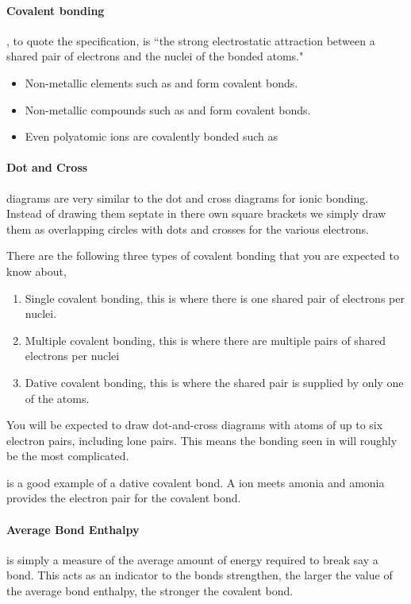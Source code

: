 	\paragraph{Covalent bonding} , to quote the specification, is ``the strong electrostatic attraction between a shared pair of electrons and the nuclei of the bonded atoms."
	\begin{itemize}
	 	\item Non-metallic elements such as  and  form covalent bonds.
	 	\item Non-metallic compounds such as  and  form covalent bonds.
	 	\item Even polyatomic ions are covalently bonded such as 
	\end{itemize}
	
	\paragraph{Dot and Cross} diagrams are very similar to the dot and cross diagrams for ionic bonding.
	Instead of drawing them septate in there own square brackets we simply draw them as overlapping circles with dots and crosses for the various electrons.
	
	There are the following three types of covalent bonding that you are expected to know about,
	\begin{enumerate}
		\item Single covalent bonding, this is where there is one shared pair of electrons per nuclei.
		\item Multiple covalent bonding, this is where there are multiple pairs of shared electrons per nuclei
		\item Dative covalent bonding, this is where the shared pair is supplied by only one of the atoms.
	\end{enumerate}
	You will be expected to draw dot-and-cross diagrams with atoms of up to six electron pairs, including lone pairs.
	This means the bonding seen in  will roughly be the most complicated.
	
	 is a good example of a dative covalent bond. A  ion meets amonia and amonia provides the electron pair for the covalent bond.
	
	\paragraph{Average Bond Enthalpy} is simply a measure of the average amount of energy required to break say a  bond.
	This acts as an indicator to the bonds strengthen, the larger the value of the average bond enthalpy, the stronger the covalent bond.
	
